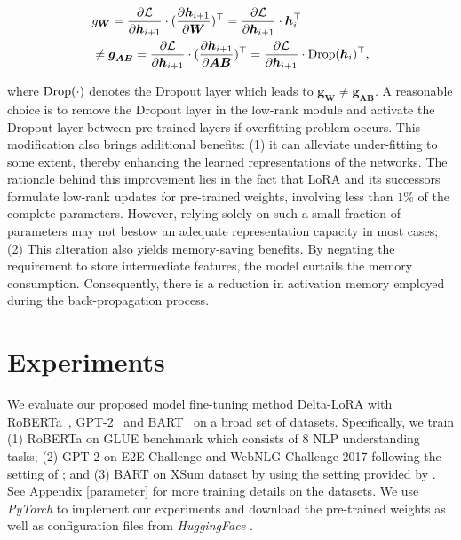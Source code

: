 {\begin{equation}
\begin{split}
    &g_{\boldsymbol{W}} = \frac{\partial {\mathcal{L}}}{\partial \boldsymbol{h}_{i+1}} \cdot (\frac{\partial \boldsymbol{h}_{i+1}}{\partial \boldsymbol{W}})^{\top} = \frac{\partial {\mathcal{L}}}{\partial \boldsymbol{h}_{i+1}} \cdot \boldsymbol{h}_i^{\top} \\
    &\neq \boldsymbol{g}_{\boldsymbol{A}\boldsymbol{B}} = \frac{\partial {\mathcal{L}}}{\partial \boldsymbol{h}_{i+1}} \cdot (\frac{\partial \boldsymbol{h}_{i+1}}{\partial \boldsymbol{A}\boldsymbol{B}})^{\top} = \frac{\partial {\mathcal{L}}}{\partial \boldsymbol{h}_{i+1}} \cdot \textup{Drop}(\boldsymbol{h}_i)^{\top},
\end{split}
\end{equation}

where $\textup{Drop}(\cdot)$ denotes the Dropout layer which leads to $\boldsymbol{g}_{\boldsymbol{W}} \neq \boldsymbol{g}_{\boldsymbol{A}\boldsymbol{B}}$.
A reasonable choice is to remove the Dropout layer in the low-rank module and activate the Dropout layer between pre-trained layers if overfitting problem occurs. This modification also brings additional benefits: (1) it can alleviate under-fitting to some extent, thereby enhancing the learned representations of the networks. The rationale behind this improvement lies in the fact that LoRA and its successors formulate low-rank updates for pre-trained weights, involving less than $1\%$ of the complete parameters. However, relying solely on such a small fraction of parameters may not bestow an adequate representation capacity in most cases; (2) This alteration also yields memory-saving benefits. By negating the requirement to store intermediate features, the model curtails the memory consumption. Consequently, there is a reduction in activation memory employed during the back-propagation process.

\section{Experiments}
We evaluate our proposed model fine-tuning method Delta-LoRA with RoBERTa~\citep{roberta_liu2019roberta}, GPT-2~\citep{gpt2_radford2019language} and BART~\citep{bart_lewis2019bart} on a broad set of datasets. Specifically, we train (1) RoBERTa on GLUE benchmark which consists of 8 NLP understanding tasks; (2) GPT-2 on E2E Challenge and WebNLG Challenge 2017 following the setting of \citet{lora_hu2022lora}; and (3) BART on XSum dataset by using the setting provided by \citet{adalora_zhang2022adaptive}. See Appendix \ref{parameter} for more training details on the datasets. We use \emph{PyTorch} to implement our experiments and download the pre-trained weights as well as configuration files from \emph{HuggingFace} \citet{huggingface_wolf2019huggingface}. 

}
